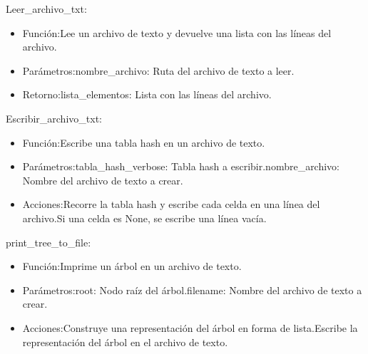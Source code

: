Leer\_archivo\_txt:
\begin{itemize}
  \item Función:\newline Lee un archivo de texto y devuelve una lista con las líneas del archivo.
  \item Parámetros:\newline nombre\_archivo: Ruta del archivo de texto a leer.
  \item Retorno:\newline lista\_elementos: Lista con las líneas del archivo.
\end{itemize}

Escribir\_archivo\_txt:
\begin{itemize}
  \item Función:\newline Escribe una tabla hash en un archivo de texto.
  \item Parámetros:\newline tabla\_hash\_verbose: Tabla hash a escribir.\newline nombre\_archivo: Nombre del archivo de texto a crear.
  \item Acciones:\newline Recorre la tabla hash y escribe cada celda en una línea del archivo.\newline Si una celda es None, se escribe una línea vacía.
\end{itemize}

print\_tree\_to\_file:
\begin{itemize}
  \item Función:\newline Imprime un árbol en un archivo de texto.
  \item Parámetros:\newline root: Nodo raíz del árbol.\newline filename: Nombre del archivo de texto a crear.
  \item Acciones:\newline Construye una representación del árbol en forma de lista.\newline Escribe la representación del árbol en el archivo de texto.
\end{itemize}
